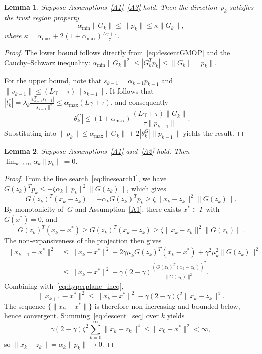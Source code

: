 \documentclass{article}
\theoremstyle{plain}
\newtheorem{lemma}{Lemma}
\theoremstyle{definition}
\theoremstyle{remark}
\newcommand{\norm}[1]{\|#1\|}
\newcommand{\thetaG}{\theta_k^{\scriptscriptstyle G}}     %
\begin{document}
\begin{lemma}\label{lem:trustregionGMOP}
Suppose Assumptions~\ref{A1}--\ref{A3} hold. Then the direction~$p_k$ satisfies the trust region property
\[
  \alpha_{\min}\norm{G_k} \leq \norm{p_k} \leq \kappa\norm{G_k},
\]
where $\kappa = \alpha_{\max} + 2(1+\alpha_{\max})\frac{L\gamma + \tau}{\tau}$.
\end{lemma}
\begin{proof}
The lower bound follows directly from~\eqref{eq:descentGMOP} and the Cauchy--Schwarz inequality: $\alpha_{\min}\norm{G_k}^2 \leq |G_k^T p_k| \leq \norm{G_k}\norm{p_k}$.

For the upper bound, note that $s_{k-1} = \alpha_{k-1} p_{k-1}$ and $\norm{v_{k-1}} \leq (L\gamma + \tau)\norm{s_{k-1}}$. It follows that $|t_k^*| = \lambda_k\frac{|v_{k-1}^T s_{k-1}|}{\norm{s_{k-1}}^2} \leq \alpha_{\max}(L\gamma + \tau)$, and consequently
\[
  |\thetaG| \leq (1+\alpha_{\max})\frac{(L\gamma + \tau)\norm{G_k}}{\tau\norm{p_{k-1}}}.
\]
Substituting into $\norm{p_k} \leq \alpha_{\max}\norm{G_k} + 2|\thetaG|\norm{p_{k-1}}$ yields the result.
\end{proof}

\begin{lemma}\label{lem:limGMOP}
Suppose Assumptions~\ref{A1} and~\ref{A2} hold. Then $\lim_{k \to \infty} \alpha_k\norm{p_k} = 0$.
\end{lemma}
\begin{proof}
From the line search~\eqref{eq:linesearch1}, we have $G(z_k)^T p_k \leq -\zeta\alpha_k\norm{p_k}^2\norm{G(z_k)}$, which gives
\begin{equation}\label{eq:hyperplane_ineq}
  G(z_k)^T(x_k - z_k) = -\alpha_k G(z_k)^T p_k \geq \zeta\norm{x_k - z_k}^2\norm{G(z_k)}.
\end{equation}
By monotonicity of~$G$ and Assumption~\ref{A1}, there exists $x^* \in \Gamma$ with $G(x^*) = 0$, and
\begin{equation}\label{eq:mono_ineq}
  G(z_k)^T(x_k - x^*) \geq G(z_k)^T(x_k - z_k) \geq \zeta\norm{x_k - z_k}^2\norm{G(z_k)}.
\end{equation}
The non-expansiveness of the projection then gives
\begin{align*}
  \norm{x_{k+1} - x^*}^2 &\leq \norm{x_k - x^*}^2 - 2\gamma\mu_k G(z_k)^T(x_k - x^*) + \gamma^2\mu_k^2\norm{G(z_k)}^2 \\
  &\leq \norm{x_k - x^*}^2 - \gamma(2-\gamma)\frac{(G(z_k)^T(x_k - z_k))^2}{\norm{G(z_k)}^2}.
\end{align*}
Combining with~\eqref{eq:hyperplane_ineq},
\begin{equation}\label{eq:descent_seq}
  \norm{x_{k+1} - x^*}^2 \leq \norm{x_k - x^*}^2 - \gamma(2-\gamma)\zeta^2\norm{x_k - z_k}^4.
\end{equation}
The sequence $\{\norm{x_k - x^*}\}$ is therefore non-increasing and bounded below, hence convergent. Summing~\eqref{eq:descent_seq} over $k$ yields
\[
  \gamma(2-\gamma)\zeta^2 \sum_{k=0}^{\infty}\norm{x_k - z_k}^4 \leq \norm{x_0 - x^*}^2 < \infty,
\]
so $\norm{x_k - z_k} = \alpha_k\norm{p_k} \to 0$.
\end{proof}
\end{document}
